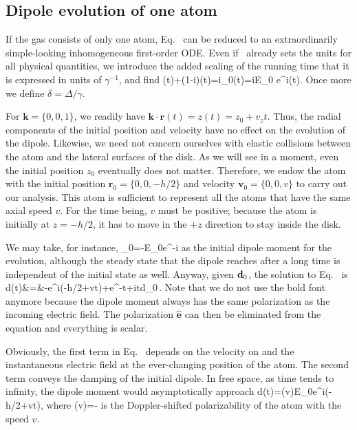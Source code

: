 \subsection{Dipole evolution of one atom}
\label{ONEATOMDIPOLE}
If the gas consists of only one atom, Eq.~ can be reduced to an extraordinarily simple-looking inhomogeneous first-order ODE. Even if~ already sets the units for all physical quantities, we introduce the added scaling of the running time that it is expressed in units of $\gamma^{-1}$, and find
\bea
{}(t)+(1-i\delta)(t)=i_0(t)=iE_0\,\,e^{i\cdot{}(t)}.
\label{SINGLEEQ}
\eea
Once more we define $\delta=\Delta/\gamma$. 

For $\mathbf{k}=\{0,0,1\}$, we readily have $\mathbf{k}\cdot\mathbf{r}(t)=z(t)=z_0+v_zt$. Thus, the radial components of the initial position and velocity have no effect on the evolution of the dipole. Likewise, we need not concern ourselves with elastic collisions between the atom and the lateral surfaces of the disk. As we will see in a moment, even the initial position $z_0$ eventually does not matter. Therefore, we endow the atom with the initial position $\mathbf{r}_0=\{0,0,-h/2\}$ and velocity $\mathbf{v}_0=\{0,0,v\}$ to carry out our analysis. This atom is sufficient to represent all the atoms that have the same axial speed $v$. For the time being, $v$ must be positive; because the atom is initially at $z=-h/2$, it has to move in the $+z$ direction to stay inside the disk.

We may take, for instance, 
\beq
{}_0=-E_0e^{-i}
\eeq
 as the initial dipole moment for the evolution, although the steady state that the dipole reaches after a long time is independent of the initial state as well. Anyway, given ${\bf d}_0$, the solution to Eq.~ is
\bea
d(t)&=&-e^{i(-h/2+vt)}+e^{-t+i\delta t}d_0\,.
\label{SINGLESOL}
\eea
Note that we do not use the bold font anymore because the dipole moment always has the same polarization as the incoming electric field. The polarization $\hat{\mathbf{e}}$ can then be eliminated from the equation and everything is  scalar.

Obviously, the first term in Eq.~ depends on the velocity on and the instantaneous electric field at the ever-changing position of the atom. The second term conveys the damping of the initial dipole. In free space, as time tends to infinity, the dipole moment would asymptotically approach
\bea
d(t\to\infty)=\alpha(v)E_0e^{i(-h/2+vt)},
\eea
where
\beq
\alpha(v)=-
\eeq
 is the Doppler-shifted polarizability of the atom with the speed $v$.

